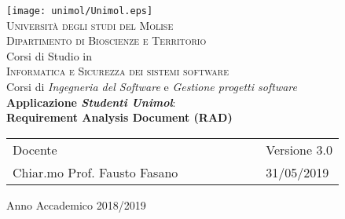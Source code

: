 \label{key}%



\begin{titlepage}
 \begin{center}
	 \texttt{[image: unimol/Unimol.eps]}\\
	 \vspace{0.8em}
	 {\Large \textsc{Università degli studi del Molise}}\\
	 \vspace{0.8em}
	 {\Large \textsc{Dipartimento di Bioscienze e Territorio}}\\
	 \vspace{2em}
	 {\normalsize Corsi di Studio in}\\
	 \vspace{1em}
	 {\Large \textsc{Informatica e Sicurezza dei sistemi software}} \\
	 \vspace{1em}
	 {\normalsize Corsi di \textit{Ingegneria del Software} e  \textit{Gestione progetti software}}\\
	 \vspace{5em}
	{\LARGE\textbf{Applicazione \textit{Studenti Unimol}}:} \\
	\vspace{1em}
	{\LARGE\textbf{Requirement Analysis Document (RAD)}} \\
	\vspace{6em}
 \end{center}

\vskip 0.2cm
  \begin{center}
	\begin{tabular}{l c c c c c c l}
	  Docente & & & & & & & Versione 3.0\\[0.2cm]
	  \large{Chiar.mo Prof. Fausto Fasano} & & & & & & & 31/05/2019\\[1cm]
	\end{tabular}
\vfill
{\normalsize Anno Accademico 2018/2019}
\end{center}
\end{titlepage}
\clearpage